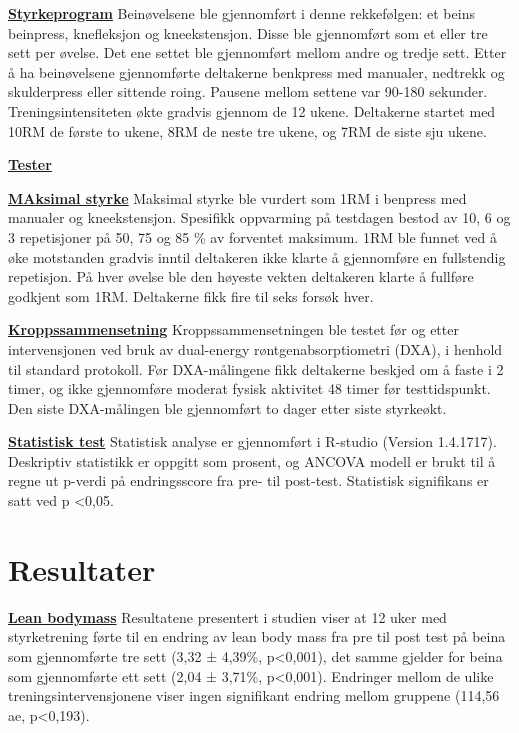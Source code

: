 \documentclass[
]{book}
\begin{document}
\underline{\textbf{Styrkeprogram}} Beinøvelsene ble gjennomført i denne
rekkefølgen: et beins beinpress, knefleksjon og kneekstensjon. Disse ble
gjennomført som et eller tre sett per øvelse. Det ene settet ble
gjennomført mellom andre og tredje sett. Etter å ha beinøvelsene
gjennomførte deltakerne benkpress med manualer, nedtrekk og skulderpress
eller sittende roing. Pausene mellom settene var 90-180 sekunder.
Treningsintensiteten økte gradvis gjennom de 12 ukene. Deltakerne
startet med 10RM de første to ukene, 8RM de neste tre ukene, og 7RM de
siste sju ukene.

\underline{\textbf{Tester}}

\underline{\textbf{MAksimal styrke}} Maksimal styrke ble vurdert som 1RM
i benpress med manualer og kneekstensjon. Spesifikk oppvarming på
testdagen bestod av 10, 6 og 3 repetisjoner på 50, 75 og 85 \% av
forventet maksimum. 1RM ble funnet ved å øke motstanden gradvis inntil
deltakeren ikke klarte å gjennomføre en fullstendig repetisjon. På hver
øvelse ble den høyeste vekten deltakeren klarte å fullføre godkjent som
1RM. Deltakerne fikk fire til seks forsøk hver.

\underline{\textbf{Kroppssammensetning}} Kroppssammensetningen ble
testet før og etter intervensjonen ved bruk av dual-energy
røntgenabsorptiometri (DXA), i henhold til standard protokoll. Før
DXA-målingene fikk deltakerne beskjed om å faste i 2 timer, og ikke
gjennomføre moderat fysisk aktivitet 48 timer før testtidspunkt. Den
siste DXA-målingen ble gjennomført to dager etter siste styrkeøkt.

\underline{\textbf{Statistisk test}} Statistisk analyse er gjennomført i
R-studio (Version 1.4.1717). Deskriptiv statistikk er oppgitt som
prosent, og ANCOVA modell er brukt til å regne ut p-verdi på
endringsscore fra pre- til post-test. Statistisk signifikans er satt ved
p \textless0,05.

\hypertarget{resultater-1}{%
\section{Resultater}\label{resultater-1}}

\underline{\textbf{Lean bodymass}} Resultatene presentert i studien
viser at 12 uker med styrketrening førte til en endring av lean body
mass fra pre til post test på beina som gjennomførte tre sett (3,32 ±
4,39\%, p\textless0,001), det samme gjelder for beina som gjennomførte
ett sett (2,04 ± 3,71\%, p\textless0,001). Endringer mellom de ulike
treningsintervensjonene viser ingen signifikant endring mellom gruppene
(114,56 ae, p\textless0,193).
\end{document}
